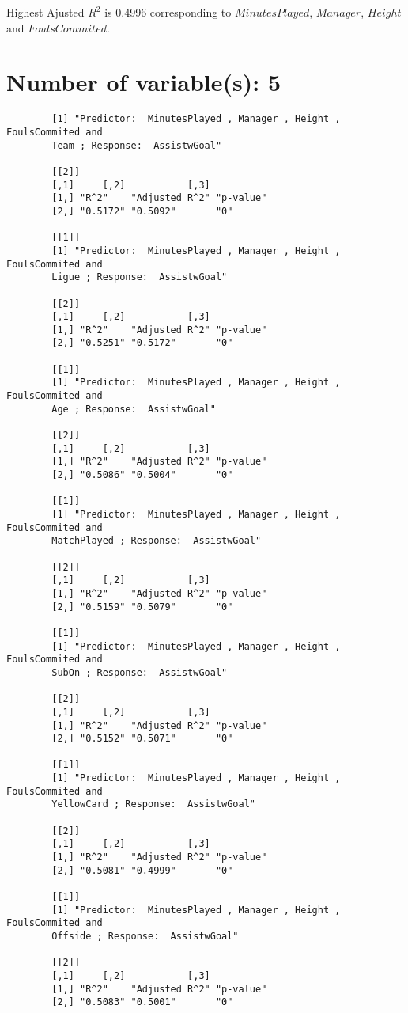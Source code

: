 \documentclass[12pt]{article}
\begin{document}
	Highest Ajusted $ R^2 $ is 0.4996 corresponding to $ MinutesPlayed $, $ Manager $, $ Height $ and $ FoulsCommited $.
	
	\section{Number of variable(s): 5}
	\begin{verbatim}
		[1] "Predictor:  MinutesPlayed , Manager , Height , FoulsCommited and 
		Team ; Response:  AssistwGoal"
		
		[[2]]
		[,1]     [,2]           [,3]     
		[1,] "R^2"    "Adjusted R^2" "p-value"
		[2,] "0.5172" "0.5092"       "0"      
		
		[[1]]
		[1] "Predictor:  MinutesPlayed , Manager , Height , FoulsCommited and 
		Ligue ; Response:  AssistwGoal"
		
		[[2]]
		[,1]     [,2]           [,3]     
		[1,] "R^2"    "Adjusted R^2" "p-value"
		[2,] "0.5251" "0.5172"       "0"      
		
		[[1]]
		[1] "Predictor:  MinutesPlayed , Manager , Height , FoulsCommited and 
		Age ; Response:  AssistwGoal"
		
		[[2]]
		[,1]     [,2]           [,3]     
		[1,] "R^2"    "Adjusted R^2" "p-value"
		[2,] "0.5086" "0.5004"       "0"      
		
		[[1]]
		[1] "Predictor:  MinutesPlayed , Manager , Height , FoulsCommited and 
		MatchPlayed ; Response:  AssistwGoal"
		
		[[2]]
		[,1]     [,2]           [,3]     
		[1,] "R^2"    "Adjusted R^2" "p-value"
		[2,] "0.5159" "0.5079"       "0"      
		
		[[1]]
		[1] "Predictor:  MinutesPlayed , Manager , Height , FoulsCommited and 
		SubOn ; Response:  AssistwGoal"
		
		[[2]]
		[,1]     [,2]           [,3]     
		[1,] "R^2"    "Adjusted R^2" "p-value"
		[2,] "0.5152" "0.5071"       "0"      
		
		[[1]]
		[1] "Predictor:  MinutesPlayed , Manager , Height , FoulsCommited and 
		YellowCard ; Response:  AssistwGoal"
		
		[[2]]
		[,1]     [,2]           [,3]     
		[1,] "R^2"    "Adjusted R^2" "p-value"
		[2,] "0.5081" "0.4999"       "0"      
		
		[[1]]
		[1] "Predictor:  MinutesPlayed , Manager , Height , FoulsCommited and 
		Offside ; Response:  AssistwGoal"
		
		[[2]]
		[,1]     [,2]           [,3]     
		[1,] "R^2"    "Adjusted R^2" "p-value"
		[2,] "0.5083" "0.5001"       "0"      
		
	\end{verbatim}
	
\end{document}
